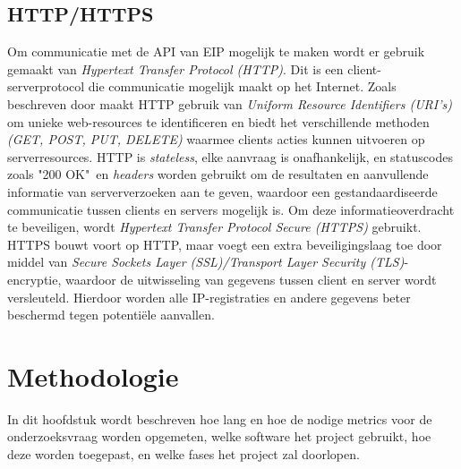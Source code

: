 \subsection{HTTP/HTTPS}
Om communicatie met de API van EIP mogelijk te maken wordt er gebruik gemaakt van \textit{Hypertext Transfer Protocol (HTTP)}. Dit is een client-serverprotocol die communicatie mogelijk maakt op het Internet. Zoals beschreven door \textcite{Fielding2014} maakt HTTP gebruik van \textit{Uniform Resource Identifiers (URI's)} om unieke web-resources te identificeren en biedt het verschillende methoden \textit{(GET, POST, PUT, DELETE)} waarmee clients acties kunnen uitvoeren op serverresources. HTTP is \textit{stateless}, elke aanvraag is onafhankelijk, en statuscodes zoals "200 OK"\ en \textit{headers} worden gebruikt om de resultaten en aanvullende informatie van serververzoeken aan te geven, waardoor een gestandaardiseerde communicatie tussen clients en servers mogelijk is.
Om deze informatieoverdracht te beveiligen, wordt \textit{Hypertext Transfer Protocol Secure (HTTPS)} gebruikt. HTTPS bouwt voort op HTTP, maar voegt een extra beveiligingslaag toe door middel van \textit{Secure Sockets Layer (SSL)/Transport Layer Security (TLS)}-encryptie, waardoor de uitwisseling van gegevens tussen client en server wordt versleuteld. Hierdoor worden alle IP-registraties en andere gegevens beter beschermd tegen potentiële aanvallen.

\section{Methodologie}
\label{voorstel:methodologie}
In dit hoofdstuk wordt beschreven hoe lang en hoe de nodige metrics voor de onderzoeksvraag worden opgemeten, welke software het project gebruikt, hoe deze worden toegepast, en welke fases het project zal doorlopen.


